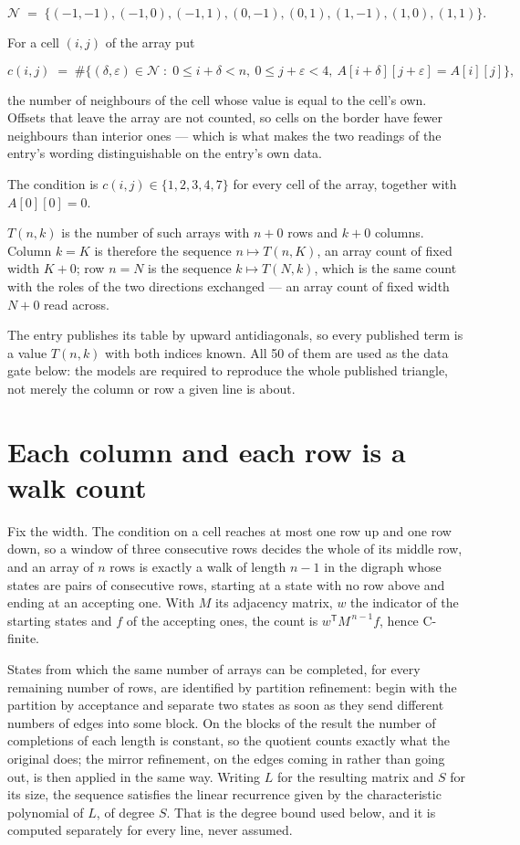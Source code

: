 \documentclass[11pt]{article}
\theoremstyle{definition}
\begin{document}
\[\mathcal{N} \;=\; \{(-1,-1), (-1,0), (-1,1), (0,-1), (0,1), (1,-1), (1,0), (1,1)\}.\]

For a cell $(i,j)$ of the array put

\[c(i,j) \;=\; \#\bigl\{(\delta,\varepsilon)\in\mathcal{N} \;:\; 0\le i+\delta<n,\ 0\le j+\varepsilon<4,\ A[i+\delta][j+\varepsilon] = A[i][j]\bigr\},\]

the number of neighbours of the cell whose value is equal to the cell's own. Offsets that leave the array are not counted, so cells on the border have fewer neighbours than interior ones --- which is what makes the two readings of the entry's wording distinguishable on the entry's own data.

The condition is $c(i,j) \in \{1, 2, 3, 4, 7\}$ for every cell of the array, together with $A[0][0]=0$.

$T(n,k)$ is the number of such arrays with $n + 0$ rows and $k + 0$ columns. Column $k = K$ is therefore the sequence $n \mapsto T(n,K)$, an array count of fixed width $K + 0$; row $n = N$ is the sequence $k \mapsto T(N,k)$, which is the same count with the roles of the two directions exchanged --- an array count of fixed width $N + 0$ read across.

The entry publishes its table by upward antidiagonals, so every published term is a value $T(n,k)$ with both indices known. All 50 of them are used as the data gate below: the models are required to reproduce the whole published triangle, not merely the column or row a given line is about.

\section{Each column and each row is a walk count}

Fix the width. The condition on a cell reaches at most one row up and one row down, so a window of three consecutive rows decides the whole of its middle row, and an array of $n$ rows is exactly a walk of length $n-1$ in the digraph whose states are pairs of consecutive rows, starting at a state with no row above and ending at an accepting one. With $M$ its adjacency matrix, $w$ the indicator of the starting states and $f$ of the accepting ones, the count is $w^{\mathsf T}M^{\,n-1}f$, hence C-finite.

States from which the same number of arrays can be completed, for every remaining number of rows, are identified by partition refinement: begin with the partition by acceptance and separate two states as soon as they send different numbers of edges into some block. On the blocks of the result the number of completions of each length is constant, so the quotient counts exactly what the original does; the mirror refinement, on the edges coming in rather than going out, is then applied in the same way. Writing $L$ for the resulting matrix and $S$ for its size, the sequence satisfies the linear recurrence given by the characteristic polynomial of $L$, of degree $S$. That is the degree bound used below, and it is computed separately for every line, never assumed.
\end{document}

